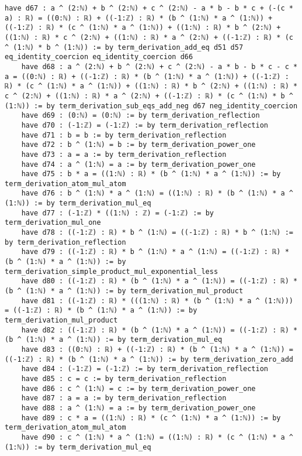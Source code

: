 \documentclass{article}
\begin{document}
\begin{tcolorbox}[colback=white!10, width=\linewidth]
\begin{lstlisting}[language=Lean4]
    have d67 : a ^ (2:ℕ) + b ^ (2:ℕ) + c ^ (2:ℕ) - a * b - b * c + (-(c * a) : ℝ) = ((0:ℕ) : ℝ) + ((-1:ℤ) : ℝ) * (b ^ (1:ℕ) * a ^ (1:ℕ)) + ((-1:ℤ) : ℝ) * (c ^ (1:ℕ) * a ^ (1:ℕ)) + ((1:ℕ) : ℝ) * b ^ (2:ℕ) + ((1:ℕ) : ℝ) * c ^ (2:ℕ) + ((1:ℕ) : ℝ) * a ^ (2:ℕ) + ((-1:ℤ) : ℝ) * (c ^ (1:ℕ) * b ^ (1:ℕ)) := by term_derivation_add_eq d51 d57 eq_identity_coercion eq_identity_coercion d66
    have d68 : a ^ (2:ℕ) + b ^ (2:ℕ) + c ^ (2:ℕ) - a * b - b * c - c * a = ((0:ℕ) : ℝ) + ((-1:ℤ) : ℝ) * (b ^ (1:ℕ) * a ^ (1:ℕ)) + ((-1:ℤ) : ℝ) * (c ^ (1:ℕ) * a ^ (1:ℕ)) + ((1:ℕ) : ℝ) * b ^ (2:ℕ) + ((1:ℕ) : ℝ) * c ^ (2:ℕ) + ((1:ℕ) : ℝ) * a ^ (2:ℕ) + ((-1:ℤ) : ℝ) * (c ^ (1:ℕ) * b ^ (1:ℕ)) := by term_derivation_sub_eqs_add_neg d67 neg_identity_coercion
    have d69 : (0:ℕ) = (0:ℕ) := by term_derivation_reflection
    have d70 : (-1:ℤ) = (-1:ℤ) := by term_derivation_reflection
    have d71 : b = b := by term_derivation_reflection
    have d72 : b ^ (1:ℕ) = b := by term_derivation_power_one
    have d73 : a = a := by term_derivation_reflection
    have d74 : a ^ (1:ℕ) = a := by term_derivation_power_one
    have d75 : b * a = ((1:ℕ) : ℝ) * (b ^ (1:ℕ) * a ^ (1:ℕ)) := by term_derivation_atom_mul_atom
    have d76 : b ^ (1:ℕ) * a ^ (1:ℕ) = ((1:ℕ) : ℝ) * (b ^ (1:ℕ) * a ^ (1:ℕ)) := by term_derivation_mul_eq
    have d77 : (-1:ℤ) * ((1:ℕ) : ℤ) = (-1:ℤ) := by term_derivation_mul_one
    have d78 : ((-1:ℤ) : ℝ) * b ^ (1:ℕ) = ((-1:ℤ) : ℝ) * b ^ (1:ℕ) := by term_derivation_reflection
    have d79 : ((-1:ℤ) : ℝ) * b ^ (1:ℕ) * a ^ (1:ℕ) = ((-1:ℤ) : ℝ) * (b ^ (1:ℕ) * a ^ (1:ℕ)) := by term_derivation_simple_product_mul_exponential_less
    have d80 : ((-1:ℤ) : ℝ) * (b ^ (1:ℕ) * a ^ (1:ℕ)) = ((-1:ℤ) : ℝ) * (b ^ (1:ℕ) * a ^ (1:ℕ)) := by term_derivation_mul_product
    have d81 : ((-1:ℤ) : ℝ) * (((1:ℕ) : ℝ) * (b ^ (1:ℕ) * a ^ (1:ℕ))) = ((-1:ℤ) : ℝ) * (b ^ (1:ℕ) * a ^ (1:ℕ)) := by term_derivation_mul_product
    have d82 : ((-1:ℤ) : ℝ) * (b ^ (1:ℕ) * a ^ (1:ℕ)) = ((-1:ℤ) : ℝ) * (b ^ (1:ℕ) * a ^ (1:ℕ)) := by term_derivation_mul_eq
    have d83 : ((0:ℕ) : ℝ) + ((-1:ℤ) : ℝ) * (b ^ (1:ℕ) * a ^ (1:ℕ)) = ((-1:ℤ) : ℝ) * (b ^ (1:ℕ) * a ^ (1:ℕ)) := by term_derivation_zero_add
    have d84 : (-1:ℤ) = (-1:ℤ) := by term_derivation_reflection
    have d85 : c = c := by term_derivation_reflection
    have d86 : c ^ (1:ℕ) = c := by term_derivation_power_one
    have d87 : a = a := by term_derivation_reflection
    have d88 : a ^ (1:ℕ) = a := by term_derivation_power_one
    have d89 : c * a = ((1:ℕ) : ℝ) * (c ^ (1:ℕ) * a ^ (1:ℕ)) := by term_derivation_atom_mul_atom
    have d90 : c ^ (1:ℕ) * a ^ (1:ℕ) = ((1:ℕ) : ℝ) * (c ^ (1:ℕ) * a ^ (1:ℕ)) := by term_derivation_mul_eq

\end{lstlisting}
\end{tcolorbox}
\end{document}
